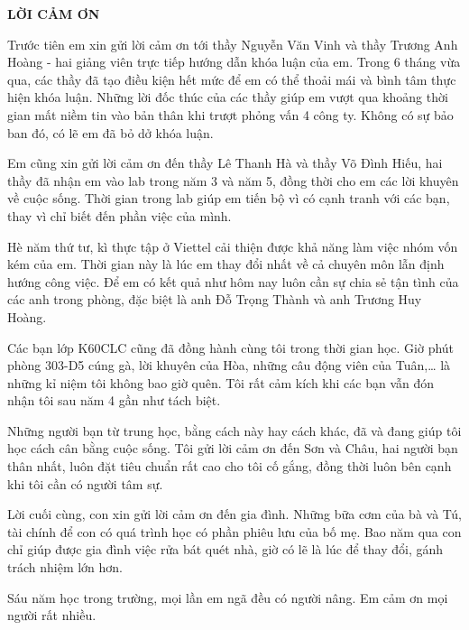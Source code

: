 \documentclass[../../../thesis]{subfiles}
\begin{document}
\begin{center}
    \textbf{\large
        LỜI CẢM ƠN
    }
\end{center}

Trước tiên em xin gửi lời cảm ơn tới thầy Nguyễn Văn Vinh và thầy Trương Anh
Hoàng - hai giảng viên trực tiếp hướng dẫn khóa luận của em. Trong 6 tháng vừa
qua, các thầy đã tạo điều kiện hết mức để em có thể thoải mái và bình tâm thực
hiện khóa luận. Những lời đốc thúc của các thầy giúp em vượt qua khoảng thời
gian mất niềm tin vào bản thân khi trượt phỏng vấn 4 công ty. Không có sự bảo
ban đó, có lẽ em đã bỏ dở khóa luận.

Em cũng xin gửi lời cảm ơn đến thầy Lê Thanh Hà và thầy Võ Đình Hiếu, hai thầy
đã nhận em vào lab trong năm 3 và năm 5, đồng thời cho em các lời khuyên về cuộc
sống. Thời gian trong lab giúp em tiến bộ vì có cạnh tranh với các bạn, thay vì
chỉ biết đến phần việc của mình.

Hè năm thứ tư, kì thực tập ở Viettel cải thiện được khả năng làm việc nhóm vốn kém
của em. Thời gian này là lúc em thay đổi nhất về cả chuyên môn lẫn định hướng
công việc. Để em có kết quả như hôm nay luôn cần sự chia sẻ tận tình của các anh
trong phòng, đặc biệt là anh Đỗ Trọng Thành và anh Trương Huy Hoàng.

Các bạn lớp K60CLC cũng đã đồng hành cùng tôi trong thời gian học. Giờ phút
phòng 303-D5 cúng gà, lời khuyên của Hòa, những câu động viên của Tuân,\ldots{}
là những kỉ niệm tôi không bao giờ quên. Tôi rất cảm kích khi các bạn vẫn đón
nhận tôi sau năm 4 gần như tách biệt.

Những người bạn từ trung học, bằng cách này hay cách khác, đã và đang giúp tôi
học cách cân bằng cuộc sống. Tôi gửi lời cảm ơn đến Sơn và Châu, hai người bạn
thân nhất, luôn đặt tiêu chuẩn rất cao cho tôi cố gắng, đồng thời luôn bên cạnh
khi tôi cần có người tâm sự.

Lời cuối cùng, con xin gửi lời cảm ơn đến gia đình. Những bữa cơm của bà và Tú,
tài chính để con có quá trình học có phần phiêu lưu của bố mẹ. Bao năm qua con
chỉ giúp được gia đình việc rửa bát quét nhà, giờ có lẽ là lúc để thay đổi, gánh
trách nhiệm lớn hơn.

Sáu năm học trong trường, mọi lần em ngã đều có người nâng. Em cảm ơn mọi người
rất nhiều.

\thispagestyle{empty}

\clearpage
\end{document}
